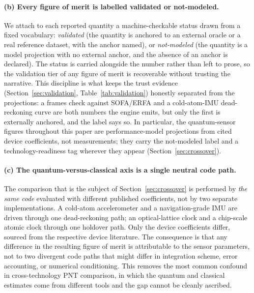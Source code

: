 \paragraph{(b) Every figure of merit is labelled validated or not-modeled.}
We attach to each reported quantity a machine-checkable status drawn from a
fixed vocabulary: \emph{validated} (the quantity is anchored to an external
oracle or a real reference dataset, with the anchor named), or \emph{not-modeled}
(the quantity is a model projection with no external anchor, and the absence of
an anchor is declared). The status is carried alongside the number rather than
left to prose, so the validation tier of any figure of merit is recoverable
without trusting the narrative. This discipline is what keeps the
trust evidence (Section~\ref{sec:validation}, Table~\ref{tab:validation})
honestly separated from the projections: a frames check against SOFA/ERFA and a
cold-atom-IMU dead-reckoning curve are both numbers the engine emits, but only
the first is externally anchored, and the label says so. In particular, the
quantum-sensor figures throughout this paper are performance-model projections
from cited device coefficients, not measurements; they carry the not-modeled
label and a technology-readiness tag wherever they appear
(Section~\ref{sec:crossover}).

\paragraph{(c) The quantum-versus-classical axis is a single neutral code path.}
The comparison that is the subject of Section~\ref{sec:crossover} is performed by
\emph{the same code} evaluated with different published coefficients, not by two
separate implementations. A cold-atom accelerometer and a navigation-grade IMU
are driven through one dead-reckoning path; an optical-lattice clock and a
chip-scale atomic clock through one holdover path. Only the device coefficients
differ, sourced from the respective device literature. The consequence is that
any difference in the resulting figure of merit is attributable to the sensor
parameters, not to two divergent code paths that might differ in integration
scheme, error accounting, or numerical conditioning. This removes the most
common confound in cross-technology PNT comparison, in which the quantum and
classical estimates come from different tools and the gap cannot be cleanly
ascribed.

